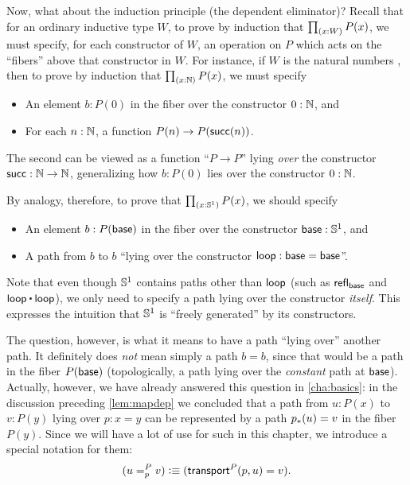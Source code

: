 %
%
Now, what about the induction principle (the dependent eliminator)?
Recall that for an ordinary inductive type $W$, to prove by induction that $\prd{x:W} P(x)$, we must specify, for each constructor of $W$, an operation on $P$ which acts on the ``fibers'' above that constructor in $W$.
For instance, if $W$ is the natural numbers \nat, then to prove by induction that $\prd{x:\nat} P(x)$, we must specify
\begin{itemize}
\item An element $b:P(0)$ in the fiber over the constructor $0:\nat$, and
\item For each $n:\nat$, a function $P(n) \to P(\suc(n))$.
\end{itemize}
The second can be viewed as a function ``$P\to P$'' lying \emph{over} the constructor $\suc:\nat\to\nat$, generalizing how $b:P(0)$ lies over the constructor $0:\nat$.

By analogy, therefore, to prove that $\prd{x:\Sn^1} P(x)$, we should specify
\begin{itemize}
\item An element $b:P(\base)$ in the fiber over the constructor $\base:\Sn^1$, and
\item A path from $b$ to $b$ ``lying over the constructor $\lloop:\base=\base$''.
\end{itemize}
Note that even though $\Sn^1$ contains paths other than $\lloop$ (such as $\refl{\base}$ and $\lloop\ct\lloop$), we only need to specify a path lying over the constructor \emph{itself}.
This expresses the intuition that $\Sn^1$ is ``freely generated'' by its constructors.

The question, however, is what it means to have a path ``lying over'' another path.
It definitely does \emph{not} mean simply a path $b=b$, since that would be a path in the fiber $P(\base)$ (topologically, a path lying over the \emph{constant} path at $\base$).
Actually, however, we have already answered this question in \cref{cha:basics}: in the discussion preceding \cref{lem:mapdep} we concluded that a path from $u:P(x)$ to $v:P(y)$ lying over $p:x=y$ can be represented by a path $\trans p u = v$ in the fiber $P(y)$.
Since we will have a lot of use for such 
%
in this chapter, we introduce a special notation for them:
\begin{equation}
  (\dpath P p u v) \defeq (\transfib{P} p u = v).\label{eq:dpath}
\end{equation}

